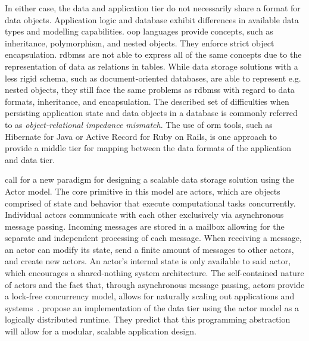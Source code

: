   In either case, the data and application tier do not necessarily share a format for data objects.
  Application logic and database exhibit differences in available data types and modelling capabilities.
  \Gls{oop} languages provide concepts, such as inheritance, polymorphism, and nested objects.
  They enforce strict object encapsulation.
  \Glspl{rdbms} are not able to express all of the same concepts due to the representation of data as relations in tables. %
  While data storage solutions with a less rigid schema, such as document-oriented databases, are able to represent e.g. nested objects, they still face the same problems as \glspl{rdbms} with regard to data formats, inheritance, and encapsulation.
  The described set of difficulties when persisting application state and data objects in a database is commonly referred to as \textit{object-relational impedance mismatch}.
  The use of \gls{orm} tools, such as Hibernate for Java or Active Record for Ruby on Rails, is one approach to provide a middle tier for mapping between the data formats of the application and data tier.

   call for a new paradigm for designing a scalable data storage solution using the Actor model.
  The core primitive in this model are actors, which are objects comprised of state and behavior that execute computational tasks concurrently.
  Individual actors communicate with each other exclusively via asynchronous message passing.
  Incoming messages are stored in a mailbox allowing for the separate and independent processing of each message.
  When receiving a message, an actor can modify its state, send a finite amount of messages to other actors, and create new actors.
  An actor's internal state is only available to said actor, which encourages a shared-nothing system architecture.
  The self-contained nature of actors and the fact that, through asynchronous message passing, actors provide a lock-free concurrency model, allows for naturally scaling out applications and systems~\cite{vernon2015reactive}.
   propose an implementation of the data tier using the actor model as a logically distributed runtime.
  They predict that this programming abstraction will allow for a modular, scalable application design.


